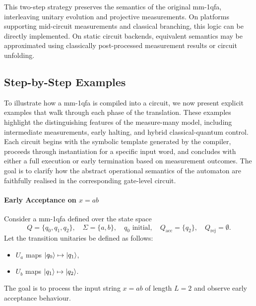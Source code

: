   

This two-step strategy preserves the semantics of the original \gls{mm-1qfa}, interleaving unitary evolution and projective measurements. On platforms supporting mid-circuit measurements and classical branching, this logic can be directly implemented. On static circuit backends, equivalent semantics may be approximated using classically post-processed measurement results or circuit unfolding.
\medskip

\subsection{Step-by-Step Examples}

To illustrate how a \gls{mm-1qfa} is compiled into a circuit, we now present explicit examples that walk through each phase of the translation. These examples highlight the distinguishing features of the measure-many model, including intermediate measurements, early halting, and hybrid classical-quantum control. Each circuit begins with the symbolic template generated by the compiler, proceeds through instantiation for a specific input word, and concludes with either a full execution or early termination based on measurement outcomes. The goal is to clarify how the abstract operational semantics of the automaton are faithfully realised in the corresponding gate-level circuit.

\paragraph{Early Acceptance on $x = ab$} \label{ex:mmqfa-early-accept}
Consider a \gls{mm-1qfa} defined over the state space
\[
Q = \{q_0, q_1, q_2\}, \quad \Sigma = \{a, b\}, \quad q_0 \text{ initial}, \quad Q_{\text{acc}} = \{q_2\}, \quad Q_{\text{rej}} = \emptyset.
\]
Let the transition unitaries be defined as follows:
\begin{itemize}
  \item $U_a$ maps $\ket{q_0} \mapsto \ket{q_1}$,
  \item $U_b$ maps $\ket{q_1} \mapsto \ket{q_2}$.
\end{itemize}
The goal is to process the input string $x = ab$ of length $L = 2$ and observe early acceptance behaviour.

